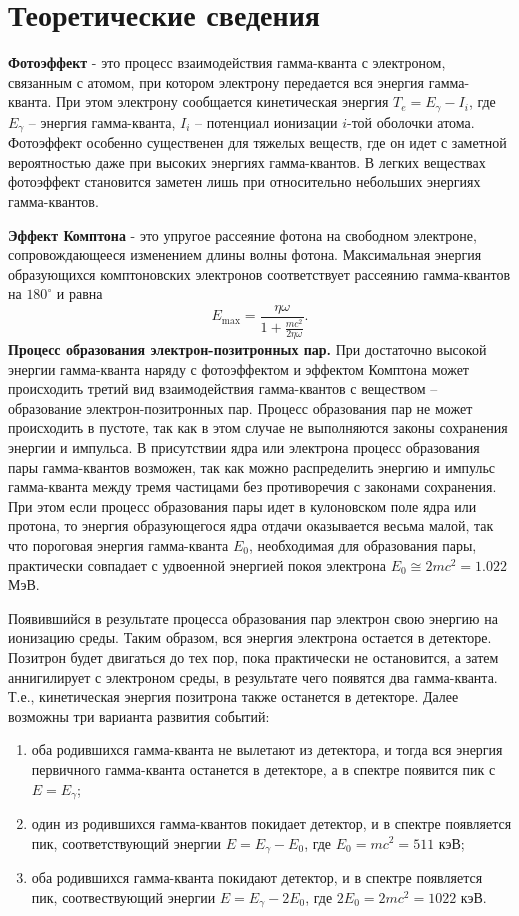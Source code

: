 \documentclass[a4paper, 12pt]{article}
\begin{document}
\section{Теоретические сведения}
\textbf{Фотоэффект} - это процесс взаимодействия гамма-кванта с электроном, связанным с атомом, при котором электрону передается вся энергия гамма-кванта. При этом электрону сообщается кинетическая энергия $T_e=E_\gamma-I_i$, где $E_\gamma$ -- энергия гамма-кванта, $I_i$ -- потенциал ионизации $i$-той оболочки атома. Фотоэффект особенно существенен для тяжелых веществ, где он идет с заметной вероятностью даже при высоких энергиях гамма-квантов. В легких веществах фотоэффект становится заметен лишь при относительно небольших энергиях гамма-квантов.  \par
\textbf{Эффект Комптона} - это упругое рассеяние фотона на свободном электроне, сопровождающееся изменением длины волны фотона. Максимальная энергия образующихся комптоновских электронов соответствует рассеянию гамма-квантов на $180^\circ$ и равна
\begin{equation}
E_{\max}=\frac{\eta\omega}{1+\frac{mc^2}{2\eta\omega}}.
\end{equation}
\textbf{Процесс образования электрон-позитронных пар.}
При достаточно высокой энергии гамма-кванта наряду с фотоэффектом и эффектом Комптона может происходить третий вид взаимодействия гамма-квантов с веществом -- образование электрон-позитронных пар. Процесс образования пар не может происходить в пустоте, так как в этом случае не выполняются законы сохранения энергии и импульса. В присутствии ядра или электрона процесс образования пары гамма-квантов возможен, так как можно распределить энергию и импульс гамма-кванта между тремя частицами без противоречия с законами сохранения. При этом если процесс образования пары идет в кулоновском поле ядра или протона, то энергия образующегося ядра отдачи оказывается весьма малой, так что пороговая энергия гамма-кванта $E_0$, необходимая для образования пары, практически совпадает с удвоенной энергией покоя электрона $E_0\cong 2mc^2=1.022$ МэВ.\par
Появившийся в результате процесса образования пар электрон свою энергию на ионизацию среды. Таким образом, вся энергия электрона остается в детекторе. Позитрон будет двигаться до тех пор, пока практически не остановится, а затем аннигилирует с электроном среды, в результате чего появятся два гамма-кванта. Т.е., кинетическая энергия позитрона также останется в детекторе. Далее возможны три варианта развития событий:
\begin{enumerate}
\item оба родившихся гамма-кванта не вылетают из детектора, и тогда вся энергия первичного гамма-кванта останется в детекторе, а в спектре появится пик с $E=E_{\gamma}$;
\item один из родившихся гамма-квантов покидает детектор, и в спектре появляется пик, соответствующий энергии $E=E_{\gamma}-E_0$, где $E_0=mc^2=511$ кэВ;
\item оба родившихся гамма-кванта покидают детектор, и в спектре появляется пик, соотвествующий энергии $E=E_{\gamma}-2E_0$, где $2E_0=2mc^2=1022$ кэВ.
\end{enumerate}
\end{document}

